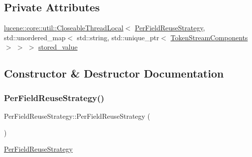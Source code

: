 \subsection*{Private Attributes}
\begin{DoxyCompactItemize}
\item 
\mbox{\hyperlink{classlucene_1_1core_1_1util_1_1CloseableThreadLocal}{lucene\+::core\+::util\+::\+Closeable\+Thread\+Local}}$<$ \mbox{\hyperlink{classlucene_1_1core_1_1analysis_1_1PerFieldReuseStrategy}{Per\+Field\+Reuse\+Strategy}}, std\+::unordered\+\_\+map$<$ std\+::string, std\+::unique\+\_\+ptr$<$ \mbox{\hyperlink{classlucene_1_1core_1_1analysis_1_1TokenStreamComponents}{Token\+Stream\+Components}} $>$ $>$ $>$ \mbox{\hyperlink{classlucene_1_1core_1_1analysis_1_1PerFieldReuseStrategy_a641b5ee9fc538da0504ae9f13438d89e}{stored\+\_\+value}}
\end{DoxyCompactItemize}


\subsection{Constructor \& Destructor Documentation}
\mbox{\label{classlucene_1_1core_1_1analysis_1_1PerFieldReuseStrategy_ab2081194878f10803b28ff228db7327c}} 
\subsubsection{\texorpdfstring{Per\+Field\+Reuse\+Strategy()}{PerFieldReuseStrategy()}}
{\footnotesize\ttfamily Per\+Field\+Reuse\+Strategy\+::\+Per\+Field\+Reuse\+Strategy (\begin{DoxyParamCaption}{ }\end{DoxyParamCaption})}

\mbox{\hyperlink{classlucene_1_1core_1_1analysis_1_1PerFieldReuseStrategy}{Per\+Field\+Reuse\+Strategy}} \mbox{\label{classlucene_1_1core_1_1analysis_1_1PerFieldReuseStrategy_ab5af1cea75460e48364696c8a89bdbeb}} 
